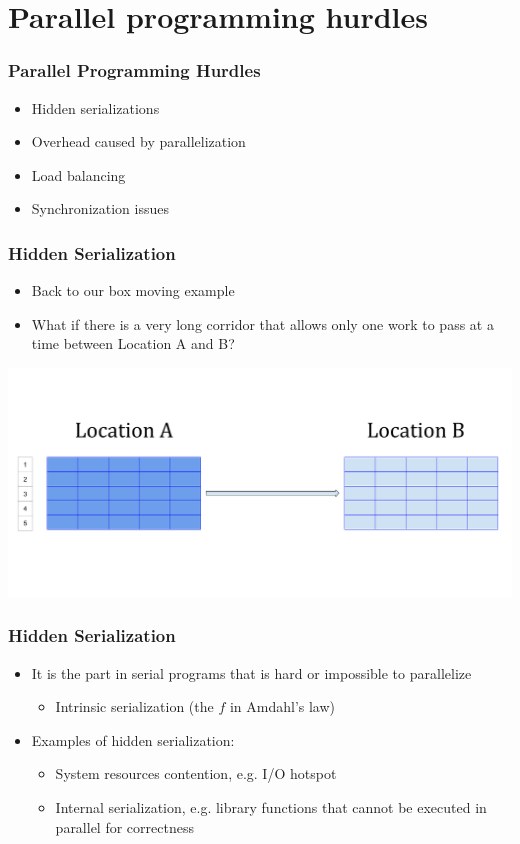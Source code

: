 \documentclass[10pt,t]{beamer}
\begin{document}
\section{Parallel programming hurdles}
\begin{frame}
  \frametitle{Parallel Programming Hurdles}
  \begin{itemize}
  \item Hidden serializations
  \item Overhead caused by parallelization
  \item Load balancing
  \item Synchronization issues
  \end{itemize}
\end{frame}

\begin{frame}
  \frametitle{Hidden Serialization}
  \begin{itemize}
  \item Back to our box moving example
  \item What if there is a very long corridor that allows only one work to pass at a time between Location A and B?
  \end{itemize}
  \includegraphics[width=\textwidth]{./Parallel_Load}
\end{frame}

\begin{frame}
  \frametitle{Hidden Serialization}
  \begin{itemize}
  \item It is the part in serial programs that is hard or impossible to parallelize
    \begin{itemize}
    \item Intrinsic serialization (the $f$ in Amdahl's law)
    \end{itemize}
  \item Examples of hidden serialization:
    \begin{itemize}
    \item System resources contention, e.g. I/O hotspot
    \item Internal serialization, e.g. library functions that cannot be executed in parallel for correctness
    \end{itemize}
  \end{itemize}
\end{frame}
\end{document}
